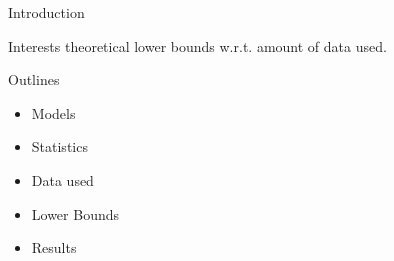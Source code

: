 \documentclass[handout]{beamer}
\begin{document}
\begin{frame}{Introduction}
\begin{block}{Interests}
theoretical lower bounds w.r.t. amount of data used.
\end{block}
\begin{block}{Outlines}
\begin{itemize}
  \item Models
  \item Statistics
  \item Data used
  \item Lower Bounds
  \item Results
\end{itemize}
\end{block}
\end{frame}
\end{document}
